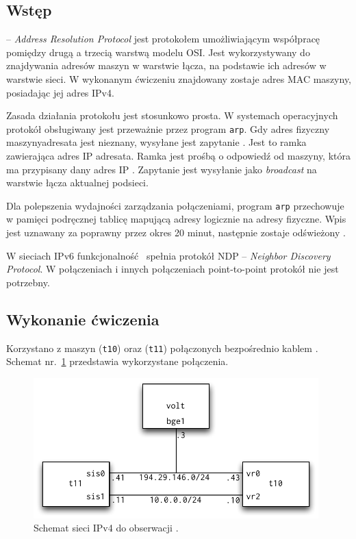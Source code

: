 \subsection{Wstęp}

\arp{} -- \emph{Address Resolution Protocol} jest protokołem umożliwiającym
współpracę pomiędzy drugą a trzecią warstwą modelu OSI. Jest wykorzystywany do
znajdywania adresów maszyn w warstwie łącza, na podstawie ich adresów w warstwie
sieci. W wykonanym ćwiczeniu znajdowany zostaje adres MAC maszyny, posiadając
jej adres IPv4.

Zasada działania protokołu \arp{} jest stosunkowo prosta. W systemach
operacyjnych protokół obsługiwany jest przeważnie przez program \texttt{arp}.
Gdy adres fizyczny maszyny\dywiz adresata jest nieznany, wysyłane jest zapytanie
\arp. Jest to ramka \eth{} zawierająca adres IP adresata. Ramka jest prośbą o
odpowiedź od maszyny, która ma przypisany dany adres IP
\cite{arp:stevens-przyklad}. Zapytanie jest wysyłanie jako \emph{broadcast}
na warstwie łącza aktualnej podsieci.

Dla polepszenia wydajności zarządzania połączeniami, program \texttt{arp}
przechowuje w pamięci podręcznej tablicę mapującą adresy logicznie na adresy
fizyczne. Wpis jest uznawany za poprawny przez okres 20 minut, następnie zostaje
odświeżony \cite{arp:stevens-cache}.

W sieciach IPv6 funkcjonalność \arp{} spełnia protokół NDP -- \emph{Neighbor
Discovery Protocol}. W połączeniach \ppp{} i innych połączeniach point-to-point
protokół \arp{} nie jest potrzebny.

\subsection{Wykonanie ćwiczenia}

Korzystano z maszyn \tjz{} (\texttt{t10}) oraz \tjj{} (\texttt{t11}) połączonych
bezpośrednio kablem \eth. Schemat nr.~\ref{fig:arp:schemat-po-konfiguracji}
przedstawia wykorzystane połączenia.

\begin{figure}[h!]
  \centering
  \includegraphics[width=11cm]{figury/arp/schemat-po-konfiguracji.pdf}
  \caption{Schemat sieci IPv4 do obserwacji \arp.}
  \label{fig:arp:schemat-po-konfiguracji}
\end{figure}

